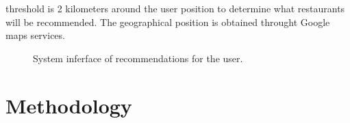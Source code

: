 threshold is 2 kilometers around the user position to determine what
restaurants will be recommended. The geographical position is
obtained throught Google maps services.
\begin{figure}
\captionsetup{font=footnotesize}
\centering
{}
\caption{System inferface of recommendations for the user.}
\label{fig:recom}    
\end{figure}

\section{Methodology} 

